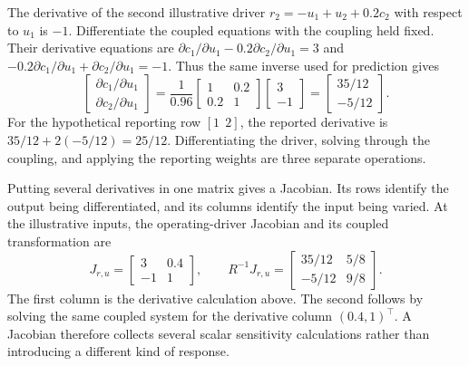The derivative of the second illustrative driver \(r_2=-u_1+u_2+0.2c_2\) with respect to \(u_1\) is \(-1\). Differentiate the coupled equations with the coupling held fixed. Their derivative equations are \(\partial c_1/\partial u_1-0.2\partial c_2/\partial u_1=3\) and \(-0.2\partial c_1/\partial u_1+\partial c_2/\partial u_1=-1\). Thus the same inverse used for prediction gives
\begin{equation}
\label{eq:icsor_small_chain_derivative}
\begin{bmatrix}\partial c_1/\partial u_1\\\partial c_2/\partial u_1\end{bmatrix}
=\frac{1}{0.96}\begin{bmatrix}1&0.2\\0.2&1\end{bmatrix}
\begin{bmatrix}3\\-1\end{bmatrix}
=\begin{bmatrix}35/12\\-5/12\end{bmatrix}.
\end{equation}
For the hypothetical reporting row \([1\ \ 2]\), the reported derivative is \(35/12+2(-5/12)=25/12\). Differentiating the driver, solving through the coupling, and applying the reporting weights are three separate operations.

Putting several derivatives in one matrix gives a Jacobian. Its rows identify the output being differentiated, and its columns identify the input being varied. At the illustrative inputs, the operating-driver Jacobian and its coupled transformation are
\begin{equation}
\label{eq:icsor_small_operating_jacobian}
J_{r,u}=\begin{bmatrix}3&0.4\\-1&1\end{bmatrix},
\qquad
R^{-1}J_{r,u}=\begin{bmatrix}35/12&5/8\\-5/12&9/8\end{bmatrix}.
\end{equation}
The first column is the derivative calculation above. The second follows by solving the same coupled system for the derivative column \((0.4,1)^\top\). A Jacobian therefore collects several scalar sensitivity calculations rather than introducing a different kind of response.

